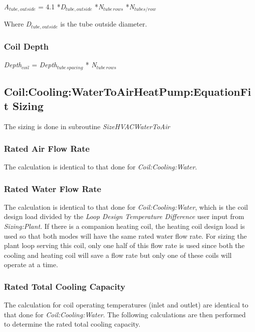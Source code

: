 \emph{A\(_{tube,outside}\)} = 4.1 *\emph{D\(_{tube,outside}\)} *\emph{N\(_{tube\, rows}\)} *\emph{N\(_{tubes/row}\)}

Where \emph{D\(_{tube,outside}\)} is the tube outside diameter.

\subsubsection{Coil Depth}\label{coil-depth}

\emph{Depth\(_{coil}\)} = \emph{Depth\(_{tube\, spacing}\)} * \emph{N\(_{tube\, rows}\)}

\subsection{Coil:Cooling:WaterToAirHeatPump:EquationFit Sizing}\label{coilcoolingwatertoairheatpumpequationfit-sizing}

The sizing is done in subroutine \emph{SizeHVACWaterToAir}

\subsubsection{Rated Air Flow Rate}\label{rated-air-flow-rate}

The calculation is identical to that done for \emph{Coil:Cooling:Water}.

\subsubsection{Rated Water Flow Rate}\label{rated-water-flow-rate}

The calculation is identical to that done for \emph{Coil:Cooling:Water}, which is the coil design load divided by the \emph{Loop Design Temperature Difference} user input from \emph{Sizing:Plant.} If there is a companion heating coil, the heating coil design load is used so that both modes will have the same rated water flow rate. For sizing the plant loop serving this coil, only one half of this flow rate is used since both the cooling and heating coil will save a flow rate but only one of these coils will operate at a time.

\subsubsection{Rated Total Cooling Capacity}\label{rated-total-cooling-capacity}

The calculation for coil operating temperatures (inlet and outlet) are identical to that done for \emph{Coil:Cooling:Water}. The following calculations are then performed to determine the rated total cooling capacity.

